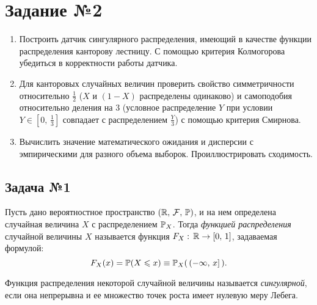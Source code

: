 \section{Задание №2}

\begin{enumerate}
        \item Построить датчик сингулярного распределения, имеющий в качестве функции распределения канторову лестницу. С помощью критерия Колмогорова убедиться в корректности работы датчика.
        \item Для канторовых случайных величин проверить свойство симметричности относительно $\frac12$ ($X$ и $(1 - X)$ распределены одинаково) и самоподобия относительно деления на $3$ (условное распределение $Y$ при условии $Y\in[0,\,\frac13]$ совпадает с распределением $\frac{Y}{3}$) с помощью критерия Смирнова.
        \item Вычислить значение математического ожидания и дисперсии с эмпирическими для разного объема выборок. Проиллюстрировать сходимость.
\end{enumerate}


\subsection{Задача №1}

\begin{definition}
        Пусть дано вероятностное пространство $(\mathbb{R},\, \mathcal{F},\,\mathbb{P})$, и на нем определена случайная величина $X$ с распределением $\mathbb{P}_X$. Тогда \textit{функцией распределения} случайной величины $X$ называется функция $F_X:\,\mathbb{R}\to[0,\,1]$, задаваемая формулой:
        $$
                F_X(x) = \mathbb{P}(X\leqslant x) \equiv \mathbb{P}_X(\,(-\infty,\,x]\,). 
        $$
\end{definition}
\begin{definition}
        Функция распределения некоторой случайной величины называется \textit{сингулярной}, если она непрерывна и ее множество точек роста имеет нулевую меру Лебега.
\end{definition}

